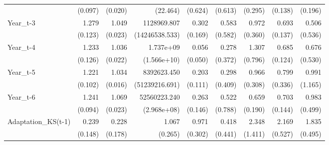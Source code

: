 \begin{table}[htbp]
\begin{tabular}{l*{8}{D{.}{.}{-1}}}
                    &     (0.097)         &     (0.020)         &    (22.464)         &     (0.624)         &     (0.613)         &     (0.295)         &     (0.138)         &     (0.196)         \\
Year\_t-3            &       1.279\sym{**} &       1.049\sym{**} & 1128969.807         &       0.302\sym{**} &       0.583         &       0.972         &       0.693\sym{*}  &       0.506         \\
                    &     (0.123)         &     (0.023)         &(14246538.533)         &     (0.169)         &     (0.582)         &     (0.360)         &     (0.137)         &     (0.536)         \\
Year\_t-4            &       1.233\sym{**} &       1.036\sym{*}  &   1.737e+09\sym{**} &       0.056\sym{***}&       0.278         &       1.307         &       0.685\sym{**} &       0.676         \\
                    &     (0.126)         &     (0.022)         & (1.566e+10)         &     (0.050)         &     (0.372)         &     (0.796)         &     (0.124)         &     (0.530)         \\
Year\_t-5            &       1.221\sym{**} &       1.034\sym{**} & 8392623.450\sym{***}&       0.203\sym{***}&       0.298         &       0.966         &       0.799         &       0.991         \\
                    &     (0.102)         &     (0.016)         &(51239216.691)         &     (0.111)         &     (0.409)         &     (0.308)         &     (0.336)         &     (1.165)         \\
Year\_t-6            &       1.241\sym{***}&       1.069\sym{***}&52560223.240\sym{***}&       0.263\sym{**} &       0.522         &       0.659\sym{\%}  &       0.703\sym{*}  &       0.983         \\
                    &     (0.094)         &     (0.023)         & (2.968e+08)         &     (0.146)         &     (0.788)         &     (0.190)         &     (0.144)         &     (0.499)         \\
Adaptation\_KS(t-1)  &       0.239\sym{**} &       0.228\sym{*}  &       1.067         &       0.971         &       0.418         &       2.348         &       2.169\sym{***}&       1.835\sym{**} \\
                    &     (0.148)         &     (0.178)         &     (0.265)         &     (0.302)         &     (0.441)         &     (1.411)         &     (0.527)         &     (0.495)         \\

\end{tabular}
\end{table}

